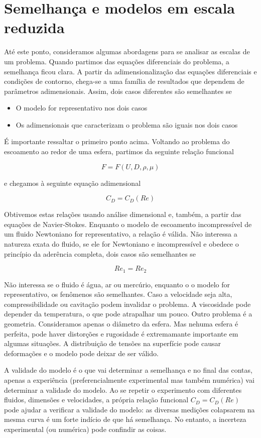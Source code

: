 \chapter{Semelhança e modelos em escala reduzida}

Até este ponto, consideramos algumas abordagens para se analisar as escalas de um problema. Quando partimos das equações diferenciais do problema, a semelhança ficou clara. A partir da adimensionalização das equações diferenciais e condições de contorno, chega-se a uma família de resultados que dependem de parâmetros adimensionais. Assim, dois casos diferentes são semelhantes se

\begin{itemize}
\item O modelo for representativo nos dois casos
\item Os adimensionais que caracterizam o problema são iguais nos dois casos
\end{itemize}

É importante ressaltar o primeiro ponto acima. Voltando ao problema do escoamento ao redor de uma esfera, partimos da seguinte relação funcional

\[
F = F(U, D, \rho, \mu)
\]

e chegamos à seguinte equação adimensional

\[
C_D = C_D(Re)
\]

Obtivemos estas relações usando análise dimensional e, também, a partir das equações de Navier-Stokes. Enquanto o modelo de escoamento incompressível de um fluido Newtoniano for representativo, a relação é válida. Não interessa a natureza exata do fluido, se ele for Newtoniano e incompressível e obedece o princípio da aderência completa, dois casos são semelhantes se

\[
Re_1 = Re_2
\]

Não interessa se o fluido é água, ar ou mercúrio, enquanto o o modelo for representativo, os fenômenos são semelhantes. Caso a velocidade seja alta, compressibilidade ou cavitação podem invalidar o problema. A viscosidade pode depender da temperatura, o que pode atrapalhar um pouco. Outro problema é a geometria. Consideramos apenas o diâmetro da esfera. Mas nehuma esfera é perfeita, pode haver distorções e rugosidade é extremamante importante em algumas situações. A distribuição de tensões na superfície pode causar deformações e o modelo pode deixar de ser válido.

A validade do modelo é o que vai determinar a semelhança e no final das contas, apenas a experiência (preferencialmente experimental mas também numérica) vai determinar a validade do modelo. Ao se repetir o experimento com diferentes fluidos, dimensões e velocidades, a própria relação funcional $C_D = C_D(Re)$ pode ajudar a verificar a validade do modelo: as diversas medições colapsarem na mesma curva é um forte indício de que há semelhança. No entanto, a incerteza experimental (ou numérica) pode confindir as coisas.

